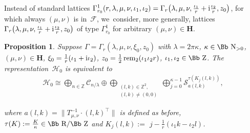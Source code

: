 \documentclass[pdftex]{sigma}
\newcommand\RR{{\mbox{\Bb R}}}
\newcommand\NN{{\mbox{\Bb N}}}
\newcommand\ZZ{{\mbox{\Bb Z}}}
\newcommand\Z{{\mathbb Z}}
\newcommand\cC{{\mathcal C}}
\newcommand\cH{{\mathcal H}}
\newcommand\cF{{\mathcal F}}
\newcommand{\rem}{\mathop{{\rm rem}}}
\numberwithin{equation}{section}
\newtheorem{Proposition}[Theorem]{Proposition}
 { \theoremstyle{definition}
\newtheorem{Definition}[Theorem]{Definition}
\newtheorem{Note}[Theorem]{Note}
\newtheorem{Example}[Theorem]{Example}
\newtheorem{Remark}[Theorem]{Remark} }
\begin{document}
Instead of standard lattices $\Gamma^1_{r_0}(r,\lambda,\mu,\nu,\iota_1,\iota_2)= \Gamma_r\big(\lambda,\mu,\nu,\frac{\iota_1}{r}+{\rm i}\frac{\iota_2}{r},z_0\big)$, for which always $(\mu,\nu)$ is in~$\cF$, we~consider, more generally, lattices $\Gamma_r\big(\lambda,\mu,\nu,\frac{\iota_1}{r}+{\rm i}\frac{\iota_2}{r},z_0\big)$ of type $\Gamma^1_{r_0}$ for arbitrary $(\mu,\nu)\in\textbf{H}$.
\begin{Proposition} \label{2piH0}
Suppose $\Gamma=\Gamma_r(\lambda,\mu,\nu,\xi_0,z_0)$ with $\lambda=2\pi\kappa$, $\kappa\in\NN_{>0}$, $(\mu,\nu)\in\textbf{H}$, $\xi_0=\frac1r(\iota_1+{\rm i}\iota_2)$, $z_0=\frac{1}{2}\rem_2(\iota_1\iota_2r)$, $\iota_1,\iota_2\in\ZZ$.
The representation~$\cH_0$ is equivalent to
\begin{gather*}
\cH_0\cong\bigoplus_{n\in \Z} \cC_{n/\lambda} \oplus \bigoplus _{\substack{(l,k)\in\Z^2,\\(l,k)\not=(0,0)}} \bigoplus_{j=0}^{\kappa-1} {\mathcal S}_{a(l,k)}^{\tau(K_j(l,k))},
\end{gather*}
{\sloppy
where $a(l,k)=\big\|T_{\mu,\nu}^{-1}\cdot(l,k)^\top\big\|$ is defined as before,
$\tau(K):=\frac{K}{\kappa}\in\RR/\ZZ$ and $K_j(l,k):=$ \mbox{$j-\frac1{r}(\iota_1 k-\iota_2l)$}.

}
\end{Proposition}
\end{document}
